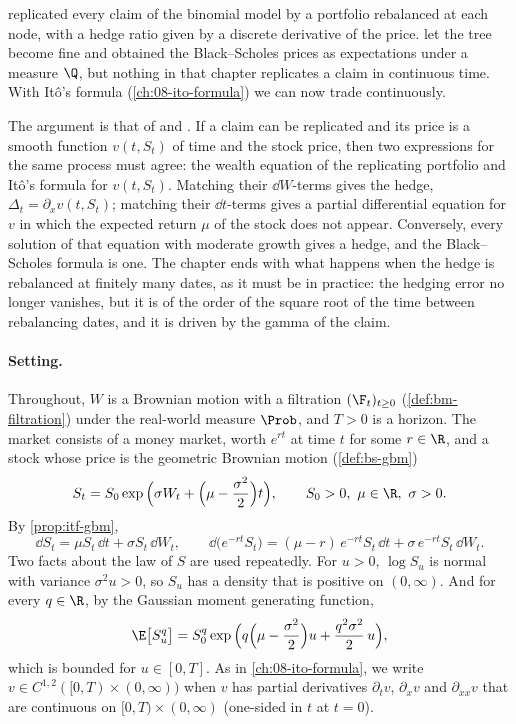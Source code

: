 
 replicated every claim of the binomial model by a portfolio rebalanced
at each node, with a hedge ratio given by a discrete derivative of the price.
 let the tree become fine and obtained the Black--Scholes
prices as expectations under a measure $\Q$, but nothing in that chapter replicates a claim in
continuous time. With It\^o's formula (\cref{ch:08-ito-formula}) we can now trade
continuously.

The argument is that of \textcite{black-scholes} and \textcite{merton1973}. If a claim can be
replicated and its price is a smooth function $v(t,S_t)$ of time and the stock price, then two
expressions for the same process must agree: the wealth equation of the replicating portfolio
and It\^o's formula for $v(t,S_t)$. Matching their $\dd W$-terms gives the hedge,
$\Delta_t=\partial_xv(t,S_t)$; matching their $\dd t$-terms gives a partial differential
equation for $v$ in which the expected return $\mu$ of the stock does not appear. Conversely,
every solution of that equation with moderate growth gives a hedge, and the Black--Scholes
formula is one. The chapter ends with what happens when the hedge is rebalanced at finitely
many dates, as it must be in practice: the hedging error no longer vanishes, but it is of the
order of the square root of the time between rebalancing dates, and it is driven by the
gamma of the claim.

\paragraph{Setting.} Throughout, $W$ is a Brownian motion with a filtration $(\F_t)_{t\ge0}$
(\cref{def:bm-filtration}) under the real-world measure $\Prob$, and $T>0$ is a horizon. The
market consists of a money market, worth $e^{rt}$ at time $t$ for some $r\in\R$, and a stock
whose price is the geometric Brownian motion (\cref{def:bs-gbm})
\begin{equation}\label{eq:dh-stock}
  S_t=S_0\exp\Big(\sigma W_t+\Big(\mu-\frac{\sigma^2}{2}\Big)t\Big),\qquad S_0>0,\ \mu\in\R,\ \sigma>0 .
\end{equation}
By \cref{prop:itf-gbm},
\begin{equation}\label{eq:dh-dS}
  \dd S_t=\mu S_t\,\dd t+\sigma S_t\,\dd W_t,\qquad
  \dd\big(e^{-rt}S_t\big)=(\mu-r)\,e^{-rt}S_t\,\dd t+\sigma\,e^{-rt}S_t\,\dd W_t .
\end{equation}
Two facts about the law of $S$ are used repeatedly. For $u>0$, $\log S_u$ is normal with
variance $\sigma^2u>0$, so $S_u$ has a density that is positive on $(0,\infty)$. And for every
$q\in\R$, by the Gaussian moment generating function,
\begin{equation}\label{eq:dh-moments}
  \E\big[S_u^q\big]=S_0^q\exp\Big(q\Big(\mu-\frac{\sigma^2}{2}\Big)u+\frac{q^2\sigma^2}{2}\,u\Big),
\end{equation}
which is bounded for $u\in[0,T]$. As in \cref{ch:08-ito-formula}, we write
$v\in C^{1,2}([0,T)\times(0,\infty))$ when $v$ has partial derivatives $\partial_tv$,
$\partial_xv$ and $\partial_{xx}v$ that are continuous on $[0,T)\times(0,\infty)$ (one-sided in
$t$ at $t=0$).

